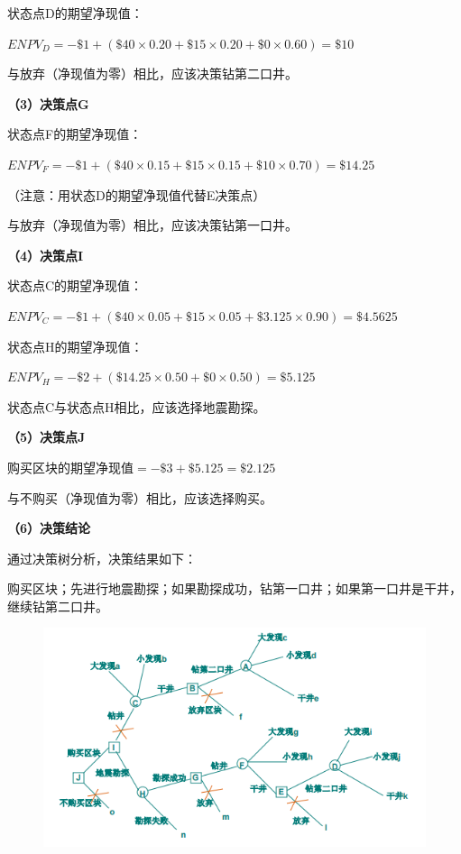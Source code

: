 状态点D的期望净现值：

$ENPV_D=-\$1+(\$40×0.20+\$15×0.20+\$0×0.60)=\$10$

与放弃（净现值为零）相比，应该决策钻第二口井。

\textbf{（3）决策点G}

状态点F的期望净现值：

$ENPV_F=-\$1+(\$40×0.15+\$15×0.15+\$10×0.70)=\$14.25$

（注意：用状态D的期望净现值代替E决策点）

与放弃（净现值为零）相比，应该决策钻第一口井。

\textbf{（4）决策点I}

状态点C的期望净现值：

$ENPV_C=-\$1+(\$40×0.05+\$15×0.05+\$3.125×0.90)=\$4.5625$

状态点H的期望净现值：

$ENPV_H=-\$2+(\$14.25×0.50+\$0×0.50)
=\$5.125$

状态点C与状态点H相比，应该选择地震勘探。

\textbf{（5）决策点J}

购买区块的期望净现值$=-\$3+\$5.125=\$2.125$

与不购买（净现值为零）相比，应该选择购买。

\textbf{（6）决策结论}

通过决策树分析，决策结果如下：

购买区块；先进行地震勘探；如果勘探成功，钻第一口井；如果第一口井是干井，继续钻第二口井。

\begin{figure}[H]
    \centering
    \includegraphics[width=1\linewidth]{image/决策结果.png}
\end{figure}